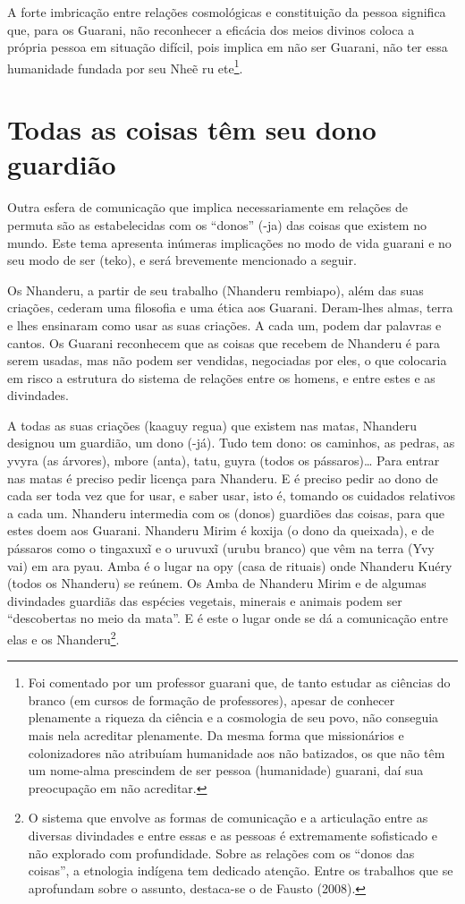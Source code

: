 {{A forte imbricação entre relações cosmológicas e constituição da pessoa
significa que, para os Guarani, não reconhecer a eficácia dos meios
divinos coloca a própria pessoa em situação difícil, pois implica em
não ser Guarani, não ter essa humanidade fundada por seu  Nheẽ ru
ete\footnote{Foi comentado por um professor guarani que, de tanto
estudar as ciências do branco (em cursos de formação de professores),
apesar de conhecer plenamente a riqueza da ciência e a cosmologia de
seu povo, não conseguia mais nela acreditar plenamente. Da mesma forma
que missionários e colonizadores não atribuíam humanidade aos não
batizados, os que não têm um nome-alma prescindem de ser pessoa
(humanidade) guarani, daí sua preocupação em não acreditar.}.  

\section{Todas as coisas têm seu dono guardião}

Outra esfera de comunicação que implica necessariamente em relações de
permuta são as estabelecidas com os ``donos'' (-ja) das coisas que
existem no mundo. Este tema apresenta inúmeras implicações no modo de
vida guarani e no seu modo de ser (teko), e será brevemente mencionado
a seguir.  

Os Nhanderu, a partir de seu trabalho (Nhanderu rembiapo), além das suas
criações, cederam uma filosofia e uma ética aos Guarani. Deram-lhes
almas, terra e lhes ensinaram como usar as suas criações. A cada um,
podem dar palavras e cantos. Os Guarani reconhecem que as coisas que
recebem de Nhanderu é para serem usadas, mas não podem ser vendidas,
negociadas por eles, o que colocaria em risco a estrutura do sistema de
relações entre os homens, e entre estes e as divindades. 

A todas as suas criações (kaaguy regua) que existem nas matas, Nhanderu
designou um guardião, um dono (-já). Tudo tem dono: os caminhos, as
pedras, as yvyra (as árvores), mbore (anta), tatu, guyra (todos os
pássaros)\ldots{} Para entrar nas matas é preciso pedir licença para
Nhanderu. E é preciso pedir ao dono de cada ser toda vez que for usar,
e saber usar, isto é, tomando os cuidados relativos a cada um. Nhanderu
intermedia com os (donos) guardiões das coisas, para que estes doem aos
Guarani.  Nhanderu Mirim é koxija (o dono da queixada), e de pássaros
como o tingaxuxĩ e o
uruvuxĩ (urubu branco) que vêm na terra (Yvy vai)
em ara pyau. Amba é o lugar na opy (casa de rituais) onde Nhanderu
Kuéry (todos os Nhanderu) se reúnem. Os Amba de Nhanderu Mirim e de
algumas divindades guardiãs das espécies vegetais, minerais e animais
podem ser ``descobertas no meio da mata''. E é este o lugar onde se dá a
comunicação entre elas e os Nhanderu\footnote{O sistema que envolve as
formas de comunicação e a articulação entre as diversas divindades e
entre essas e as pessoas é extremamente sofisticado e não explorado com
profundidade. Sobre as relações com os ``donos das coisas'', a etnologia
indígena tem dedicado atenção. Entre os trabalhos que se aprofundam
sobre o assunto, destaca-se o de Fausto (2008). }. 

}}
